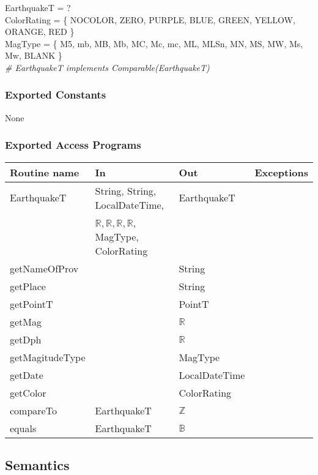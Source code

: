 \documentclass[12pt]{article}
\begin{document}
EarthquakeT = ?\\

\noindent ColorRating = \{ NOCOLOR, ZERO, PURPLE, BLUE, GREEN, YELLOW, ORANGE, RED \}\\

\noindent MagType = \{ M5, mb, MB, Mb, MC, Mc, mc, ML, MLSn, MN, MS, MW, Ms, Mw, BLANK \}\\

\noindent \textit{\# EarthquakeT implements Comparable(EarthquakeT)}

\subsubsection* {Exported Constants}

None

\subsubsection* {Exported Access Programs}

\begin{tabular}{| l | l | l | l |}
\hline
\textbf{Routine name} & \textbf{In} & \textbf{Out} & \textbf{Exceptions}\\
\hline
EarthquakeT & String, String, LocalDateTime, & EarthquakeT &\\
\hhline{|~|~|~|}
~ &$\mathbb{R}, \mathbb{R}, \mathbb{R}, \mathbb{R}$, MagType, ColorRating & ~ &\\
\hline
getNameOfProv & ~ & String & \\
\hline
getPlace & ~ & String & \\
\hline
getPointT & ~ & PointT & \\
\hline
getMag & ~ & $\mathbb{R}$ & \\
\hline
getDph & ~ & $\mathbb{R}$ & \\
\hline
getMagitudeType & ~ & MagType & \\
\hline
getDate & ~ & LocalDateTime & \\
\hline
getColor & ~ & ColorRating & \\
\hline
compareTo & EarthquakeT & $\mathbb{Z}$ & \\
\hline
equals & EarthquakeT & $\mathbb{B}$ & \\
\hline
\end{tabular}

\subsection* {Semantics}
\end{document}
